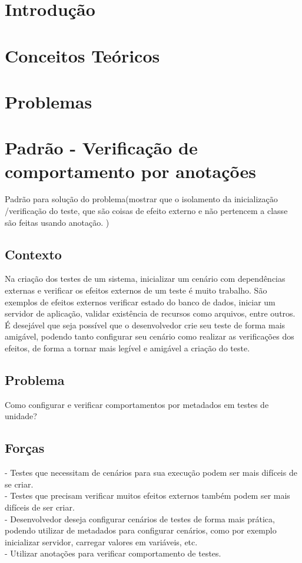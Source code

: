 \documentclass[12pt,a4paper,oneside]{book}
\begin{document}




\chapter{Introdução}

\chapter{Conceitos Teóricos}

\chapter{Problemas}


\chapter{Padrão - Verificação de comportamento por anotações}

Padrão para solução do problema(mostrar que o isolamento da inicialização /verificação do teste, que são coisas de efeito externo e não pertencem a classe são feitas  usando anotação. )


\section{Contexto}
Na criação dos testes de um sistema, inicializar um cenário com dependências externas e verificar os efeitos externos de um teste é muito trabalho. São exemplos de efeitos externos verificar estado do banco de dados, iniciar um servidor de aplicação, validar existência de recursos como arquivos, entre outros. É desejável que seja possível que o desenvolvedor crie seu teste de forma mais amigável, podendo tanto configurar seu cenário como realizar as verificações dos efeitos, de forma a tornar mais legível e amigável a criação do teste.

\section{Problema}
Como configurar e verificar comportamentos por metadados em testes de unidade?

\section{Forças}
- Testes que necessitam de cenários para sua execução podem ser mais difíceis de se criar.\\
- Testes que precisam verificar muitos efeitos externos também podem ser mais difíceis de ser criar. \\
- Desenvolvedor deseja configurar cenários de testes de forma mais prática, podendo utilizar de metadados para configurar cenários, como por exemplo inicializar servidor, carregar valores em variáveis, etc.\\
- Utilizar anotações para verificar comportamento de testes.\\
\end{document}
